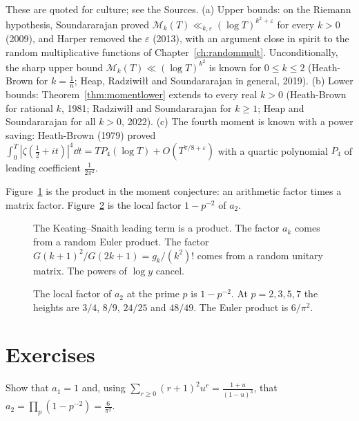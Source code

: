 \begin{remark}
These are quoted for culture; see the Sources. (a) Upper bounds: on the Riemann hypothesis, Soundararajan proved $\mathcal M_k(T)\ll_{k,\varepsilon}(\log T)^{k^2+\varepsilon}$ for every $k>0$ (2009), and Harper removed the $\varepsilon$ (2013), with an argument close in spirit to the random multiplicative functions of Chapter~\ref{ch:randommult}. Unconditionally, the sharp upper bound $\mathcal M_k(T)\ll(\log T)^{k^2}$ is known for $0\le k\le2$ (Heath-Brown for $k=\frac1n$; Heap, Radziwi\l\l{} and Soundararajan in general, 2019). (b) Lower bounds: Theorem~\ref{thm:momentlower} extends to every real $k>0$ (Heath-Brown for rational $k$, 1981; Radziwi\l\l{} and Soundararajan for $k\ge1$; Heap and Soundararajan for all $k>0$, 2022). (c) The fourth moment is known with a power saving: Heath-Brown (1979) proved $\int_0^T|\zeta(\frac12+it)|^4\dd t=TP_4(\log T)+O(T^{7/8+\varepsilon})$ with a quartic polynomial $P_4$ of leading coefficient $\frac1{2\pi^2}$.
\end{remark}

Figure~\ref{fig:v15c10-split} is the product in the moment conjecture: an arithmetic factor times a matrix factor. Figure~\ref{fig:v15c10-arithmetic} is the local factor \(1-p^{-2}\) of \(a_2\).

\begin{figure}[ht]
\centering
{}
\caption{The Keating--Snaith leading term is a product. The factor \(a_k\) comes from a random Euler product. The factor \(G(k+1)^2/G(2k+1)=g_k/(k^2)!\) comes from a random unitary matrix. The powers of \(\log y\) cancel.}
\label{fig:v15c10-split}
\end{figure}

\begin{figure}[ht]
\centering
{}
\caption{The local factor of \(a_2\) at the prime \(p\) is \(1-p^{-2}\). At \(p=2,3,5,7\) the heights are \(3/4\), \(8/9\), \(24/25\) and \(48/49\). The Euler product is \(6/\pi^2\).}
\label{fig:v15c10-arithmetic}
\end{figure}

\section{Exercises}

\begin{exercise}[$\star$]\label{ex:ak}
Show that $a_1=1$ and, using $\sum_{r\ge0}(r+1)^2u^r=\frac{1+u}{(1-u)^3}$, that $a_2=\prod_p(1-p^{-2})=\frac6{\pi^2}$.
\end{exercise}


